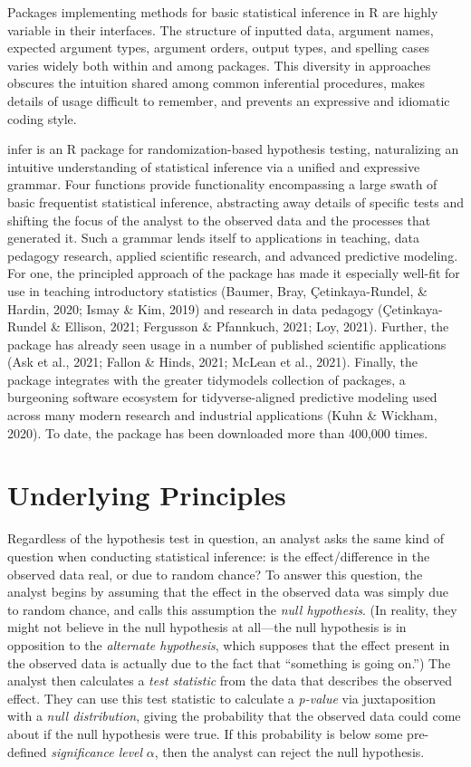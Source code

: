 \documentclass[10pt,a4paper,onecolumn]{article}
\begin{document}
Packages implementing methods for basic statistical inference in R are
highly variable in their interfaces. The structure of inputted data,
argument names, expected argument types, argument orders, output types,
and spelling cases varies widely both within and among packages. This
diversity in approaches obscures the intuition shared among common
inferential procedures, makes details of usage difficult to remember,
and prevents an expressive and idiomatic coding style.

infer is an R package for randomization-based hypothesis testing,
naturalizing an intuitive understanding of statistical inference via a
unified and expressive grammar. Four functions provide functionality
encompassing a large swath of basic frequentist statistical inference,
abstracting away details of specific tests and shifting the focus of the
analyst to the observed data and the processes that generated it. Such a
grammar lends itself to applications in teaching, data pedagogy
research, applied scientific research, and advanced predictive modeling.
For one, the principled approach of the package has made it especially
well-fit for use in teaching introductory statistics (Baumer, Bray,
Çetinkaya-Rundel, \& Hardin, 2020; Ismay \& Kim, 2019) and research in
data pedagogy (Çetinkaya-Rundel \& Ellison, 2021; Fergusson \&
Pfannkuch, 2021; Loy, 2021). Further, the package has already seen usage
in a number of published scientific applications (Ask et al., 2021;
Fallon \& Hinds, 2021; McLean et al., 2021). Finally, the package
integrates with the greater tidymodels collection of packages, a
burgeoning software ecosystem for tidyverse-aligned predictive modeling
used across many modern research and industrial applications (Kuhn \&
Wickham, 2020). To date, the package has been downloaded more than
400,000 times.

\hypertarget{underlying-principles}{%
\section{Underlying Principles}\label{underlying-principles}}

Regardless of the hypothesis test in question, an analyst asks the same
kind of question when conducting statistical inference: is the
effect/difference in the observed data real, or due to random chance? To
answer this question, the analyst begins by assuming that the effect in
the observed data was simply due to random chance, and calls this
assumption the \emph{null hypothesis}. (In reality, they might not
believe in the null hypothesis at all---the null hypothesis is in
opposition to the \emph{alternate hypothesis}, which supposes that the
effect present in the observed data is actually due to the fact that
``something is going on.'') The analyst then calculates a \emph{test
statistic} from the data that describes the observed effect. They can
use this test statistic to calculate a \emph{p-value} via juxtaposition
with a \emph{null distribution}, giving the probability that the
observed data could come about if the null hypothesis were true. If this
probability is below some pre-defined \emph{significance level}
\(\alpha\), then the analyst can reject the null hypothesis.
\end{document}
